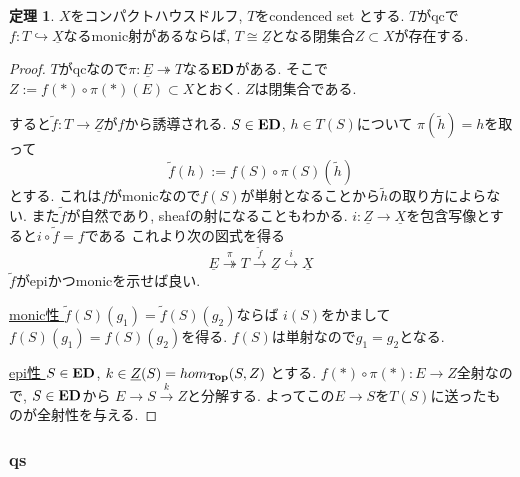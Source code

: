 \documentclass[dvipdfmx,a4paper,11pt]{report}
\theoremstyle{definition}
\newtheorem{thm}{定理}
\begin{document}
  \begin{tcolorbox}
 [colback = white, colframe = green!35!black, fonttitle = \bfseries,breakable = true]
 \begin{thm}\cite[Proposition 4.12.3]{Bar22}
 \label{thm-qs-monic}
$X$をコンパクトハウスドルフ, $T$をcondenced set とする.
$T$がqcで$f : T \hookrightarrow \underline{X}$なるmonic射があるならば, 
$T  \cong \underline{Z}$となる閉集合$Z \subset X$が存在する. 
 \end{thm}
 \end{tcolorbox}
 \begin{proof}
 $T$がqcなので$\pi : \underline{E} \twoheadrightarrow T$なる${\bf  ED}$がある. 
 そこで$Z:= f(\ast)\circ{\pi(\ast)}(E)  \subset X$とおく. 
 $Z$は閉集合である.
 
すると$\widetilde{f} : T \to \underline{Z}$が$f$から誘導される.
$S \in {\bf ED}$, $h \in T(S)$について
$\pi(\widetilde{h}) = h$を取って
$$
\widetilde{f}(h):= f(S) \circ \pi(S)(\widetilde{h})
$$
とする.
これは$f$がmonicなので$f(S)$が単射となることから$\widetilde{h}$の取り方によらない.
また$\widetilde{f}$が自然であり, sheafの射になることもわかる. 
$i : \underline{Z} \to \underline{X}$を包含写像とすると$i \circ \widetilde{f} = f$である
 これより次の図式を得る
 $$
 \underline{E} \overset{\pi}{\twoheadrightarrow}
 T \overset{\widetilde{f}}{\to}
  \underline{Z} \overset{i}{\hookrightarrow}
  \underline{X}
 $$
 $\widetilde{f}$がepiかつmonicを示せば良い.
 
 \underline{monic性 }$\widetilde{f}(S)(g_1) = \widetilde{f}(S)(g_2)$ならば
$i(S)$をかまして$f(S)(g_1) = f(S)(g_2)$を得る. $f(S)$は単射なので$g_1 = g_2$となる.

 \underline{epi性 } $S \in {\bf ED}$, $k \in \underline{Z}(S) = hom_{{\bf Top}}(S, Z)$
とする. $f(\ast)\circ{\pi(\ast)} : E \to Z$全射なので, $S \in {\bf ED}$から
$E \to S \overset{k}{\to} Z$と分解する. 
よってこの$E\to S$を$T(S)$に送ったものが全射性を与える.

 \end{proof}

 
 \subsubsection{qs}
 
\end{document}

